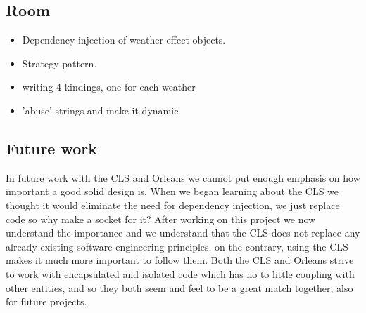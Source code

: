 

\subsection{Room}
\begin{itemize}
	\item Dependency injection of weather effect objects.
	\item Strategy pattern.
	\item writing 4 kindings, one for each weather
	\item 'abuse' strings and make it dynamic
\end{itemize}



\subsection{Future work}
In future work with the CLS and Orleans we cannot put enough emphasis on how important a good solid design is. When we began learning about the CLS we thought it would eliminate the need for dependency injection, we just replace code so why make a socket for it? After working on this project we now understand the importance and we understand that the CLS does not replace any already existing software engineering principles, on the contrary, using the CLS makes it much more important to follow them. Both the CLS and Orleans strive to work with encapsulated and isolated code which has no to little coupling with other entities, and so they both seem and feel to be a great match together, also for future projects.
